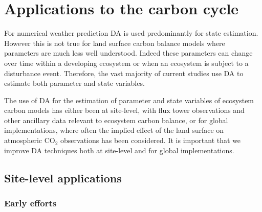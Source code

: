 \section{Applications to the carbon cycle}

For numerical weather prediction DA is used predominantly for state estimation. However this is not true for land surface carbon balance models where parameters are much less well understood. Indeed these parameters can change over time within a developing ecosystem or when an ecosystem is subject to a disturbance event. Therefore, the vast majority of current studies use DA to estimate both parameter and state variables.

The use of DA for the estimation of parameter and state variables of ecosystem carbon models has either been at site-level, with flux tower observations and other ancillary data relevant to ecosystem carbon balance, or for global implementations, where often the implied effect of the land surface on atmospheric CO\(_{2}\) observations has been considered. It is important that we improve DA techniques both at site-level and for global implementations.   

\subsection{Site-level applications}


\subsubsection{Early efforts}

